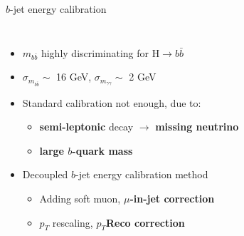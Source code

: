 \begin{frame}{$b$-jet energy calibration}
\begin{columns}
\begin{itemize}
    \item $m_{b\bar{b}}$ highly discriminating for H$\to b\bar{b}$
    \item $\sigma_{m_{b\bar{b}}}\sim$ 16 GeV, $\sigma_{m_{\gamma\gamma}}\sim$ 2 GeV
    \item Standard calibration not enough, due to: 
    \begin{itemize}
        \item \textcolor{HHred}{\textbf{semi-leptonic}} decay $\to$ \textcolor{HHturquoise_d}{\textbf{missing neutrino}}
        \item \textcolor{HHturquoise_d}{\textbf{large $b$-quark mass}}
    \end{itemize}
\pause    
    \item Decoupled $b$-jet energy calibration method
    \begin{itemize}
        \item Adding soft muon, \textcolor{HHred}{\textbf{$\mu$-in-jet correction}}
        \item $p_T$ rescaling, \textcolor{HHturquoise_d}{\textbf{$p_T$Reco correction}}
    \end{itemize}
\end{itemize}
\end{columns}
\end{frame}

